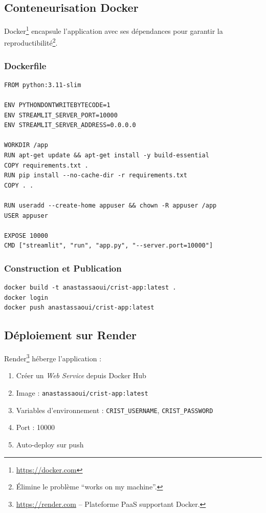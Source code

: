 \documentclass[12pt,a4paper,twoside]{article}
\begin{document}
\subsection{Conteneurisation Docker}

Docker\footnote{\url{https://docker.com}} encapsule l'application avec ses dépendances pour garantir la reproductibilité\footnote{Élimine le problème ``works on my machine''.}.

\subsubsection{Dockerfile}

\begin{verbatim}
FROM python:3.11-slim

ENV PYTHONDONTWRITEBYTECODE=1
ENV STREAMLIT_SERVER_PORT=10000
ENV STREAMLIT_SERVER_ADDRESS=0.0.0.0

WORKDIR /app
RUN apt-get update && apt-get install -y build-essential
COPY requirements.txt .
RUN pip install --no-cache-dir -r requirements.txt
COPY . .

RUN useradd --create-home appuser && chown -R appuser /app
USER appuser

EXPOSE 10000
CMD ["streamlit", "run", "app.py", "--server.port=10000"]
\end{verbatim}

\subsubsection{Construction et Publication}

\begin{verbatim}
docker build -t anastassaoui/crist-app:latest .
docker login
docker push anastassaoui/crist-app:latest
\end{verbatim}

\subsection{Déploiement sur Render}

Render\footnote{\url{https://render.com} -- Plateforme PaaS supportant Docker.} héberge l'application :

\begin{enumerate}[noitemsep]
    \item Créer un \textit{Web Service} depuis Docker Hub
    \item Image : \texttt{anastassaoui/crist-app:latest}
    \item Variables d'environnement : \texttt{CRIST\_USERNAME}, \texttt{CRIST\_PASSWORD}
    \item Port : 10000
    \item Auto-deploy sur push
\end{enumerate}
\end{document}
